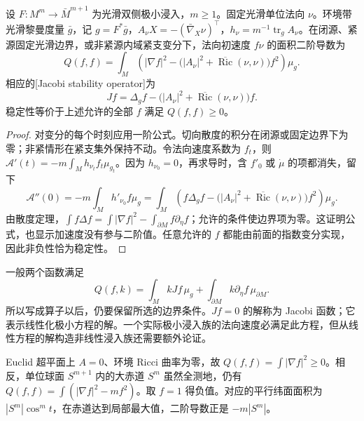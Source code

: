 \begin{theorem}\label{g3:thm:minimal-hypersurface-second-variation}
	设 \(F:M^m\to\bar M^{m+1}\) 为光滑双侧极小浸入，\(m\ge1\)。固定光滑单位法向 \(\nu\)。环境带光滑黎曼度量 \(\bar g\)，记 \(g=F^*\bar g\)，\(A_\nu X=-(\bar\nabla_X\nu)^\top\)，\(h_\nu=m^{-1}\operatorname{tr}_gA_\nu\)。在闭源、紧源固定光滑边界，或非紧源内域紧支变分下，法向初速度 \(f\nu\) 的面积二阶导数为
	\begin{equation}\label{g3:eq:minimal-hypersurface-index-form}
		Q(f,f)=\int_M\left(|\nabla f|^2-
		\bigl(|A_\nu|^2+\overline{\operatorname{Ric}}(\nu,\nu)\bigr)f^2\right)\mu_g.
	\end{equation}
	相应的[Jacobi stability operator]为
	\begin{equation}\label{g3:eq:minimal-hypersurface-jacobi}
		Jf=\Delta_g f-
		\bigl(|A_\nu|^2+\overline{\operatorname{Ric}}(\nu,\nu)\bigr)f.
	\end{equation}
	稳定性等价于上述允许的全部 \(f\) 满足 \(Q(f,f)\ge0\)。
\end{theorem}
\begin{proof}
	对变分的每个时刻应用一阶公式。切向散度的积分在闭源或固定边界下为零；非紧情形在紧支集外保持不动。令法向速度系数为 \(f_t\)，则
	\(\mathcal A'(t)=-m\int_Mh_{\nu_t}f_t\mu_{g_t}\)。因为 \(h_{\nu_0}=0\)，再求导时，含 \(f'_0\) 或 \(\dot\mu\) 的项都消失，留下
	\[
		\mathcal A''(0)=-m\int_M h'_{\nu_0}f\mu_g
		=\int_M\left(f\Delta_g f-
		\bigl(|A_\nu|^2+\overline{\operatorname{Ric}}(\nu,\nu)\bigr)f^2\right)\mu_g.
	\]
	由散度定理，\(\int f\Delta f=\int|\nabla f|^2-\int_{\partial M}f\partial_\eta f\)；允许的条件使边界项为零。这证明公式，也显示加速度没有参与二阶值。任意允许的 \(f\) 都能由前面的指数变分实现，因此非负性恰为稳定性。
\end{proof}

一般两个函数满足
\[
	Q(f,k)=\int_M kJf\,\mu_g+\int_{\partial M}k\partial_\eta f\,\mu_{\partial M}.
\]
所以写成算子以后，仍要保留所选的边界条件。\(Jf=0\) 的解称为 Jacobi 函数；它表示线性化极小方程的解。一个实际极小浸入族的法向速度必满足此方程，但从线性方程的解构造非线性浸入族还需要额外论证。

\begin{example}\label{g3:exm:plane-stability-equator-instability}
	Euclid 超平面上 \(A=0\)、环境 Ricci 曲率为零，故 \(Q(f,f)=\int|\nabla f|^2\ge0\)。相反，单位球面 \(S^{m+1}\) 内的大赤道 \(S^m\) 虽然全测地，仍有
	\(Q(f,f)=\int(|\nabla f|^2-mf^2)\)。取 \(f=1\) 得负值。对应的平行纬面面积为 \(|S^m|\cos^m t\)，在赤道达到局部最大值，二阶导数正是 \(-m|S^m|\)。
\end{example}

